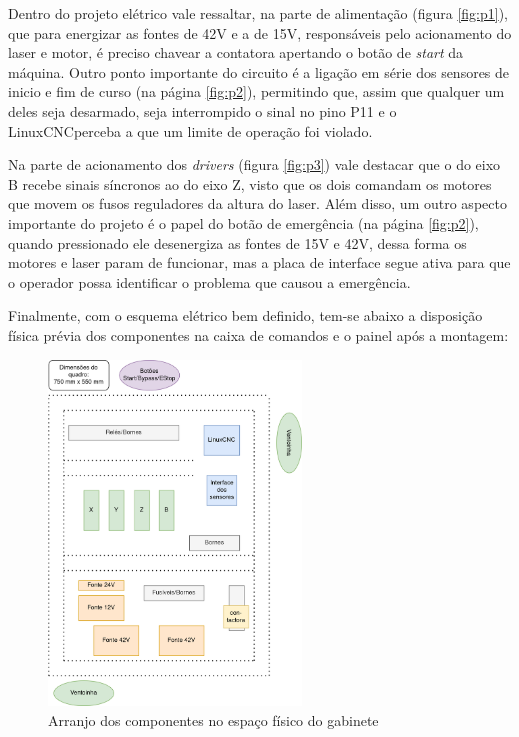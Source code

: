 \documentclass[
	article,			%
	11pt,				%
	oneside,			%
	a4paper,			%
	section=TITLE,		%
	english,			%
	brazil,				%
	sumario=tradicional
	]{abntex2}
\newcommand{\LCNC}{LinuxCNC}
\begin{document}
\newpage

Dentro do projeto elétrico vale ressaltar, na parte de alimentação (figura \ref{fig:p1}), que para energizar as fontes de 42V e a de 15V, responsáveis pelo acionamento do laser e motor, é preciso chavear a contatora apertando o botão de \textit{start} da máquina. Outro ponto importante do circuito é a ligação em série dos sensores de inicio e fim de curso (na página \ref{fig:p2}), permitindo que, assim que qualquer um deles seja desarmado, seja interrompido o sinal no pino P11 e o \LCNC perceba a que um limite de operação foi violado.

Na parte de acionamento dos \textit{drivers} (figura \ref{fig:p3}) vale destacar que o do eixo B recebe sinais síncronos ao do eixo Z, visto que os dois comandam os motores que movem os fusos reguladores da altura do laser. Além disso, um outro aspecto importante do projeto é o papel do botão de emergência (na página \ref{fig:p2}), quando pressionado ele desenergiza as fontes de 15V e 42V, dessa forma os motores e laser param de funcionar, mas a placa de interface segue ativa para que o operador possa identificar o problema que causou a emergência.

Finalmente, com o esquema elétrico bem definido, tem-se abaixo a disposição física prévia dos componentes na caixa de comandos e o painel após a montagem: 


\begin{figure}[H]
    \centering
    \includegraphics[width=0.6\textwidth]{img/PainelFis.png}
    \caption{Arranjo dos componentes no espaço físico do gabinete}
    \label{fig:arranjo-painel}
\end{figure}
\end{document}
